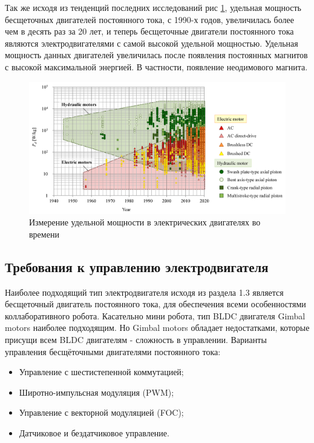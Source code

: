 Так же исходя из тенденций последних исследований \citep{Sakama2022} рис \ref{magnets}, удельная мощность бесщеточных двигателей постоянного тока, с 1990-х годов, увеличилась более чем в десять раз за 20 лет, и теперь бесщеточные двигатели постоянного тока являются электродвигателями с самой высокой удельной мощностью. Удельная мощность данных двигателей увеличилась после появления постоянных магнитов с высокой максимальной энергией. В частности, появление неодимового магнита.

\begin{figure}[H]
	\centering
	\includegraphics[width=\textwidth]{Src/images/magnets.png}
	\caption{Измерение удельной мощности в электрических двигателях во времени \citep{Sakama2022}}
	\label{magnets}
\end{figure}

\subsection{Требования к управлению электродвигателя}

Наиболее подходящий тип электродвигателя исходя из раздела 1.3 является бесщеточный двигатель постоянного тока, для обеспечения всеми особенностями коллаборативного робота. Касательно мини робота, тип BLDC двигателя Gimbal motors наиболее подходящим. Но Gimbal motors обладает недостатками, которые присущи всем BLDC двигателям - сложность в управлении. 
Варианты управления бесщёточными двигателями постоянного тока:
\begin{itemize}
	\item Управление с шестистепенной коммутацией;
	\item Широтно-импульсная модуляция (PWM);
	\item Управление с векторной модуляцией (FOC);
	\item Датчиковое и бездатчиковое управление.
\end{itemize}

